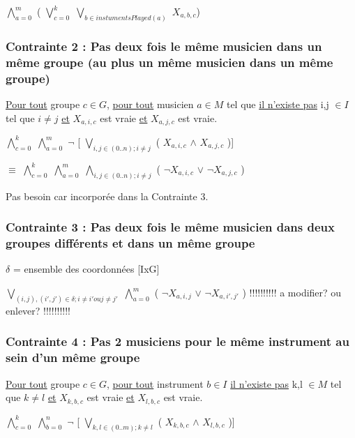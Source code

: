 \documentclass[a4paper,10pt]{article}
\begin{document}
$\bigwedge \limits_{a=0}^{m}$ ( $\bigvee \limits_{c=0}^{k}$ $\bigvee \limits_{b \in instumentsPlayed(a) }$  $X_{a,b,c}$)



\subsubsection{Contrainte 2 : Pas deux fois le même musicien dans un même groupe (au plus un même musicien dans un même groupe)}


\underline{Pour tout} groupe $c \in G$, \underline{pour tout} musicien $a \in M $ tel que \underline{il n'existe pas} i,j $\in I$  tel que $i \neq j$ \underline{et} $X_{a,i,c}$ est vraie
\underline{et} $X_{a,j,c}$ est vraie.


$\bigwedge \limits_{c=0}^{k}$ $\bigwedge \limits_{a=0}^{m}$ $\neg$ [ $\bigvee \limits_{i,j \in (0..n); i\neq j}$ ( $X_{a,i,c}$ $\wedge$ $X_{a,j,c}$ )]


$\equiv$ $\bigwedge \limits_{c=0}^{k}$ $\bigwedge \limits_{a=0}^{m}$  $\bigwedge \limits_{i,j \in (0..n); i\neq j}$ ( $\neg X_{a,i,c}$ $\vee $ $ \neg X_{a,j,c}$ )


Pas besoin car incorporée dans la Contrainte 3.

\subsubsection{Contrainte 3 : Pas deux fois le même musicien dans deux groupes différents et dans un même groupe}

$\delta$ = ensemble des coordonnées [IxG]

 $\bigvee \limits_{(i,j), (i',j') \in \delta ; i\neq i' ou j\neq j'}$ $\bigwedge \limits_{a=0}^{m}$ ( $\neg X_{a,i,j}$ $\vee $ $ \neg X_{a,i',j'}$ )
!!!!!!!!!! a modifier? ou enlever? !!!!!!!!!!

\subsubsection{Contrainte 4 : Pas 2 musiciens pour le même instrument au sein d'un même groupe}
 
\underline{Pour tout} groupe $c \in G$, \underline{pour tout} instrument $b \in I$ \underline{il n'existe pas} k,l $\in M$  tel que $k \neq l$ \underline{et} $X_{k,b,c}$ est vraie
\underline{et} $X_{l,b,c}$ est vraie. 
 
$\bigwedge \limits_{c=0}^{k}$ $\bigwedge \limits_{b=0}^{n}$ $\neg$ [ $\bigvee \limits_{k,l \in (0..m); k\neq l}$ ( $X_{k,b,c}$ $\wedge$ $X_{l,b,c}$ )]
\end{document}
